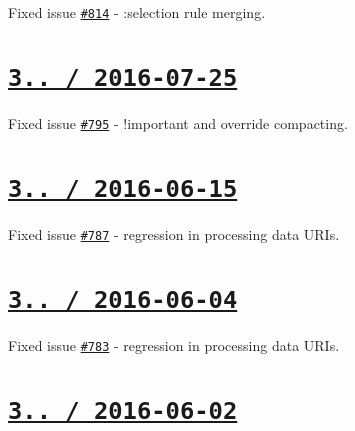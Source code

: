 
\begin{DoxyItemize}
\item Fixed issue \href{https://github.com/jakubpawlowicz/clean-css/issues/814}{\tt \#814} -\/ {\ttfamily \+:selection} rule merging.
\end{DoxyItemize}

\section*{\href{https://github.com/jakubpawlowicz/clean-css/compare/v3.4.18...v3.4.19}{\tt 3.. / 2016-\/07-\/25} }


\begin{DoxyItemize}
\item Fixed issue \href{https://github.com/jakubpawlowicz/clean-css/issues/795}{\tt \#795} -\/ {\ttfamily !important} and override compacting.
\end{DoxyItemize}

\section*{\href{https://github.com/jakubpawlowicz/clean-css/compare/v3.4.17...v3.4.18}{\tt 3.. / 2016-\/06-\/15} }


\begin{DoxyItemize}
\item Fixed issue \href{https://github.com/jakubpawlowicz/clean-css/issues/787}{\tt \#787} -\/ regression in processing data U\+R\+Is.
\end{DoxyItemize}

\section*{\href{https://github.com/jakubpawlowicz/clean-css/compare/v3.4.16...v3.4.17}{\tt 3.. / 2016-\/06-\/04} }


\begin{DoxyItemize}
\item Fixed issue \href{https://github.com/jakubpawlowicz/clean-css/issues/783}{\tt \#783} -\/ regression in processing data U\+R\+Is.
\end{DoxyItemize}

\section*{\href{https://github.com/jakubpawlowicz/clean-css/compare/v3.4.15...v3.4.16}{\tt 3.. / 2016-\/06-\/02} }


